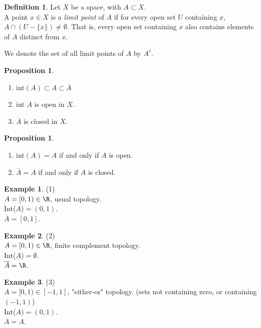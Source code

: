 \documentclass[a5paper]{article}
\theoremstyle{definition}%
\newtheorem{proposition}[theorem]{Proposition}
\newtheorem*{definition*}{Definition}
\newtheorem*{example*}{Example}
\numberwithin{exercise}{section}
\theoremstyle{remark}%
\begin{document}
\begin{highlight}
\begin{definition*}
Let  $X$ be a space, with $A \subset X$. \\
A point $x \in X$ is a \emph{limit point} of $A$ if for every open set $U$ containing $x$, $A\cap (U-\{x\})\neq \emptyset$. That is, every open set containing $x$ also contains elements of $A$ distinct from $x$. 

We denote the set of all limit points of $A$ by $A^\ell$. 
\end{definition*}
\end{highlight}

\begin{proposition}\mbox{}
\begin{enumerate}[label=(\alph*)]
\item int$(A) \subset A \subset \overline{A}$
\item int $A$ is open in $X$. 
\item $\overline{A}$ is closed in $X$.
\end{enumerate}
\end{proposition}

\begin{proposition}\mbox{}
\begin{enumerate}[label=(\alph*)]
\item int$(A) = A$ if and only if $A$ is open. 
\item $\overline{A} = A$ if and only if $A$ is closed.
\end{enumerate}
\end{proposition}

\begin{example*}(1)\\
$A = [0,1) \in \R$, usual topology. \\
Int($A$)$=(0,1)$. \\
$\overline{A} = [0,1]$. 
\end{example*}

\begin{example*}(2)\\
$A = [0,1) \in \R$, finite complement topology. \\
Int($A$)$=\emptyset$. \\
$\overline{A} = \R$. 
\end{example*}

\begin{example*}(3)\\
$A = [0,1) \in [-1,1]$, "either-or" topology. (sets not containing zero, or containing $(-1,1)$)\\
Int($A$)$=(0,1)$. \\
$\overline{A} = A$. 
\end{example*}
\end{document}
